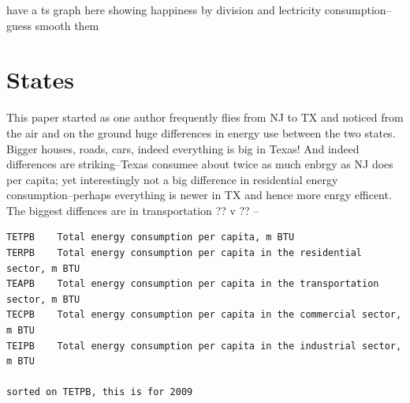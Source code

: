 \documentclass[10pt, letterpaper]{article}
\begin{document}
\begin{spacing}{1.4}
have a ts graph here showing happiness by division and lectricity
consumption--guess smooth them

\section{States}

This paper started as one author frequently flies from NJ to TX and noticed from
the air and on the ground huge differences in energy use between the two
states. Bigger houses, roads, cars, indeed everything is big in Texas! And
indeed differences are striking--Texas consumee about twice as much enbrgy as NJ
does per capita; yet interestingly not a big difference in residential energy
consumption--perhaps everything is newer in TX and hence more enrgy
efficent. The biggest diffences are in transportation ?? v ?? --


\begin{spacing}{.8}
{\footnotesize
\begin{verbatim}
TETPB    Total energy consumption per capita, m BTU
TERPB    Total energy consumption per capita in the residential sector, m BTU
TEAPB    Total energy consumption per capita in the transportation sector, m BTU
TECPB    Total energy consumption per capita in the commercial sector, m BTU
TEIPB    Total energy consumption per capita in the industrial sector, m BTU

sorted on TETPB, this is for 2009


\end{verbatim}}
\end{spacing}
\end{spacing}
\end{document}
